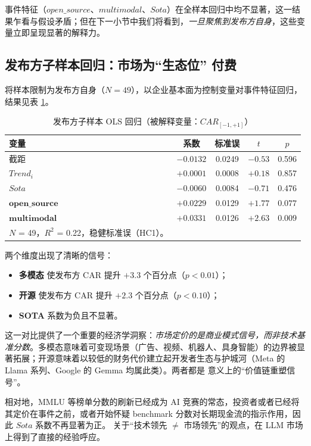 \documentclass[11pt]{ctexart}
\begin{document}
事件特征（$open\_source$、$multimodal$、$Sota$）在全样本回归中均不显著，这一结果乍看与假设矛盾；但在下一小节中我们将看到，\emph{一旦聚焦到发布方自身}，这些变量立即呈现显著的解释力。

\subsection{发布方子样本回归：市场为“生态位” 付费}

将样本限制为发布方自身（$N=49$），以企业基本面为控制变量对事件特征回归，结果见表 \ref{tab:pub_ols}。

\begin{table}[htbp]
\centering
\caption{发布方子样本 OLS 回归（被解释变量：$CAR_{[-1,+1]}$）}
\label{tab:pub_ols}
\small
\begin{tabular}{lcccc}
\toprule
变量 & 系数 & 标准误 & $t$ & $p$ \\
\midrule
截距                 & $-0.0132$ & 0.0249 & $-0.53$ & 0.596 \\
$Trend_i$            & $+0.0001$ & 0.0008 & $+0.18$ & 0.857 \\
$Sota$               & $-0.0060$ & 0.0084 & $-0.71$ & 0.476 \\
$\mathbf{open\_source}$ & $\mathbf{+0.0229}$ & 0.0129 & $\mathbf{+1.77}$ & $\mathbf{0.077}$ \\
$\mathbf{multimodal}$   & $\mathbf{+0.0331}$ & 0.0126 & $\mathbf{+2.63}$ & $\mathbf{0.009}$ \\
\midrule
$N$ = 49，$R^2$ = 0.22，稳健标准误（HC1）。
\end{tabular}
\end{table}

两个维度出现了清晰的信号：
\begin{itemize}
\item \textbf{多模态} 使发布方 CAR 提升 $+3.3$ 个百分点（$p<0.01$）；
\item \textbf{开源} 使发布方 CAR 提升 $+2.3$ 个百分点（$p<0.10$）；
\item \textbf{SOTA} 系数为负且不显著。
\end{itemize}

这一对比提供了一个重要的经济学洞察：\emph{市场定价的是商业模式信号，而非技术基准分数}。多模态意味着可变现场景（广告、视频、机器人、具身智能）的边界被显著拓展；开源意味着以较低的财务代价建立起开发者生态与护城河（Meta 的 Llama 系列、Google 的 Gemma 均属此类）。两者都是 \cite{Porter1985} 意义上的“价值链重塑信号”。

相对地，MMLU 等榜单分数的刷新已经成为 AI 竞赛的常态，投资者或者已经将其定价在事件之前，或者开始怀疑 benchmark 分数对长期现金流的指示作用，因此 $Sota$ 系数不再显著为正。\cite{GoldfarbTucker2019} 关于“技术领先 $\neq$ 市场领先”的观点，在 LLM 市场上得到了直接的经验呼应。
\end{document}
